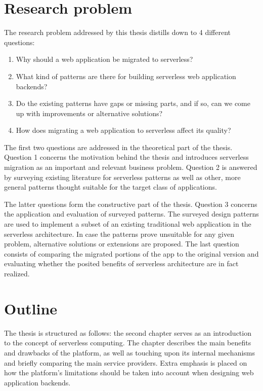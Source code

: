 \documentclass[utf8,english]{gradu3}
\begin{document}
\section{Research problem}

The research problem addressed by this thesis distills down to 4 different questions:
\begin{enumerate}
  \item Why should a web application be migrated to serverless?
  \item What kind of patterns are there for building serverless web application backends?
  \item Do the existing patterns have gaps or missing parts, and if so, can we come up with improvements or alternative solutions?
  \item How does migrating a web application to serverless affect its quality?
\end{enumerate}

The first two questions are addressed in the theoretical part of the thesis. Question 1 concerns the motivation behind the thesis and introduces serverless migration as an important and relevant business problem. Question 2 is answered by surveying existing literature for serverless patterns as well as other, more general patterns thought suitable for the target class of applications.

The latter questions form the constructive part of the thesis. Question 3 concerns the application and evaluation of surveyed patterns. The surveyed design patterns are used to implement a subset of an existing traditional web application in the serverless architecture. In case the patterns prove unsuitable for any given problem, alternative solutions or extensions are proposed. The last question consists of comparing the migrated portions of the app to the original version and evaluating whether the posited benefits of serverless architecture are in fact realized.

\section{Outline}

The thesis is structured as follows: the second chapter serves as an introduction to the concept of serverless computing. The chapter describes the main benefits and drawbacks of the platform, as well as touching upon its internal mechanisms and briefly comparing the main service providers. Extra emphasis is placed on how the platform's limitations should be taken into account when designing web application backends.
\end{document}

